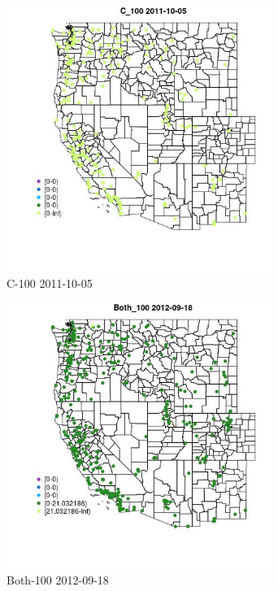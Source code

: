 \begin{figure} 
\centering  
\includegraphics[width=0.77\textwidth]{Code_Outputs/ML_input_report_ML_input_PM25_Step5_part_d_de_duplicated_aves_ML_input_MapObsC_1002011-10-05.jpg} 
\caption{\label{fig:ML_input_report_ML_input_PM25_Step5_part_d_de_duplicated_aves_ML_inputMapObsC_1002011-10-05}C-100 2011-10-05} 
\end{figure} 
 

\begin{figure} 
\centering  
\includegraphics[width=0.77\textwidth]{Code_Outputs/ML_input_report_ML_input_PM25_Step5_part_d_de_duplicated_aves_ML_input_MapObsBoth_1002012-09-18.jpg} 
\caption{\label{fig:ML_input_report_ML_input_PM25_Step5_part_d_de_duplicated_aves_ML_inputMapObsBoth_1002012-09-18}Both-100 2012-09-18} 
\end{figure} 
 

